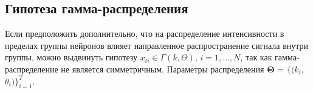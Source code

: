 \documentclass[12pt,twoside]{article}
\begin{document}
\subsection{Гипотеза гамма-распределения}
Если предположить дополнительно, что на распределение интенсивности в пределах группы нейронов влияет направленное распространение сигнала внутри группы, можно выдвинуть гипотезу $x_{ti}
\in \Gamma(k, \Theta)$, $i=1,\dots,N$, так как гамма-распределение не является симметричным. Параметры распределения $\mathbf{\Theta}$ = $\{(k_i$, $\theta_i)\}_{i=1}^T$.







\end{document}
